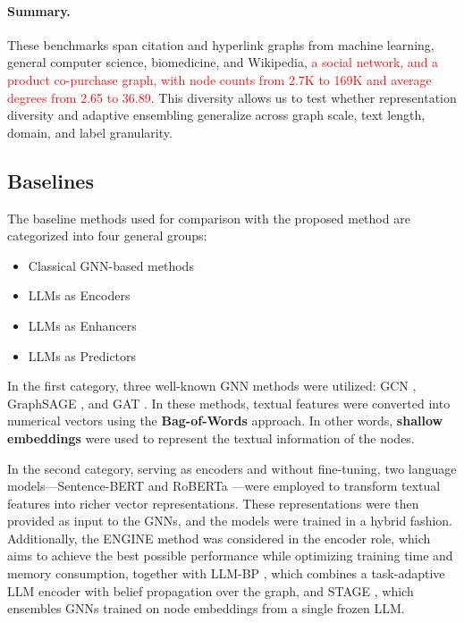 \documentclass[a4paper,fleqn]{cas-sc}
\newcommand{\revone}[1]{\textcolor{red}{#1}}   %
\DeclareRobustCommand{\revcommon}[2][]{\textcolor{revshared}{#2}} %
\begin{document}
\paragraph{Summary.}
These benchmarks span citation and hyperlink graphs from machine learning, general computer science, biomedicine, and Wikipedia, \revone{a social network, and a product co-purchase graph, with node counts from 2.7K to 169K and average degrees from 2.65 to 36.89}. This diversity allows us to test whether representation diversity and adaptive ensembling generalize across graph scale, text length, domain, and label granularity.
\subsection{Baselines}
The baseline methods used for comparison with the proposed method are categorized into four general groups:
\begin{itemize}
    \item Classical GNN-based methods
    \item LLMs as Encoders
    \item LLMs as Enhancers
    \item LLMs as Predictors
\end{itemize}

In the first category, three well-known GNN methods were utilized: GCN  \citep{Kipf2016GCN}, GraphSAGE  \citep{hamilton2017sage}, and GAT  \citep{Velickovic2018GAT}. In these methods, textual features were converted into numerical vectors using the \textbf{Bag-of-Words} approach. In other words, \textbf{shallow embeddings} were used to represent the textual information of the nodes.

In the second category, serving as encoders and without fine-tuning, two language models—Sentence-BERT  \citep{reimers2019sentencebert} and RoBERTa  \citep{zhuang2021robustly}—were employed to transform textual features into richer vector representations. These representations were then provided as input to the GNNs, and the models were trained in a hybrid fashion. Additionally, the ENGINE  \citep{Zhu2024EfficientTextualGraphs} method was considered in the encoder role, which aims to achieve the best possible performance while optimizing training time and memory consumption\revcommon[R2,R4]{, together with LLM-BP \citep{wang2025llmbp}, which combines a task-adaptive LLM encoder with belief propagation over the graph, and STAGE \citep{zolnai-lucas-etal-2024-stage}, which ensembles GNNs trained on node embeddings from a single frozen LLM}.
\end{document}

